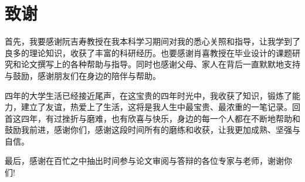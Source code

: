 
\chapter*{致谢}

首先，我要感谢阮吉寿教授在我本科学习期间对我的悉心关照和指导，让我学到了良多的理论知识，收获了丰富的科研经历。也要感谢肖喜教授在毕业设计的课题研究和论文撰写上的各种帮助与指导。同时也感谢父母、家人在背后一直默默地支持与鼓励，感谢朋友们在身边的陪伴与帮助。

四年的大学生活已经接近尾声，在这宝贵的四年时光中，我收获了知识，锻炼了能力，建立了友谊，热爱上了生活，这将是我人生中最宝贵、最浓重的一笔记录。回首这四年，有过挫折与磨难，也有欣喜与快乐，身边的每一个人都在不断地帮助和鼓励我前进，感谢你们，感谢这段时间所有的磨练和收获，让我更加成熟、坚强与自信。

最后，感谢在百忙之中抽出时间参与论文审阅与答辩的各位专家与老师，谢谢你们!